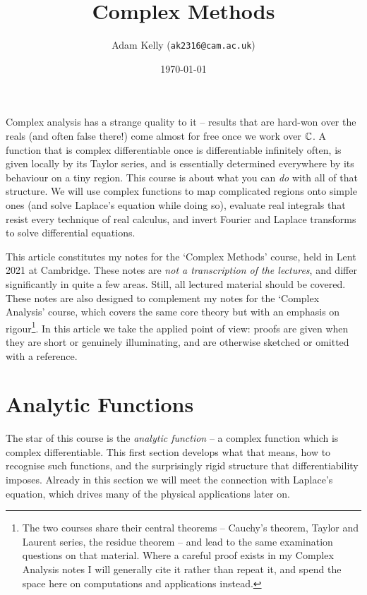\documentclass[a4paper]{scrartcl}
\title{Complex Methods}
\author{Adam Kelly (\texttt{ak2316@cam.ac.uk})}
\date{\today}
\begin{document}
\maketitle

Complex analysis has a strange quality to it -- results that are hard-won over the reals (and often false there!) come almost for free once we work over $\mathbb{C}$. A function that is complex differentiable once is differentiable infinitely often, is given locally by its Taylor series, and is essentially determined everywhere by its behaviour on a tiny region. This course is about what you can \emph{do} with all of that structure. We will use complex functions to map complicated regions onto simple ones (and solve Laplace's equation while doing so), evaluate real integrals that resist every technique of real calculus, and invert Fourier and Laplace transforms to solve differential equations.

This article constitutes my notes for the `Complex Methods' course, held in Lent 2021 at Cambridge. These notes are \emph{not a transcription of the lectures}, and differ significantly in quite a few areas. Still, all lectured material should be covered. These notes are also designed to complement my notes for the `Complex Analysis' course, which covers the same core theory but with an emphasis on rigour\footnote{The two courses share their central theorems -- Cauchy's theorem, Taylor and Laurent series, the residue theorem -- and lead to the same examination questions on that material. Where a careful proof exists in my Complex Analysis notes I will generally cite it rather than repeat it, and spend the space here on computations and applications instead.}. In this article we take the applied point of view: proofs are given when they are short or genuinely illuminating, and are otherwise sketched or omitted with a reference.

\tableofcontents

\section{Analytic Functions}

The star of this course is the \emph{analytic function} -- a complex function which is complex differentiable. This first section develops what that means, how to recognise such functions, and the surprisingly rigid structure that differentiability imposes. Already in this section we will meet the connection with Laplace's equation, which drives many of the physical applications later on.
\end{document}
